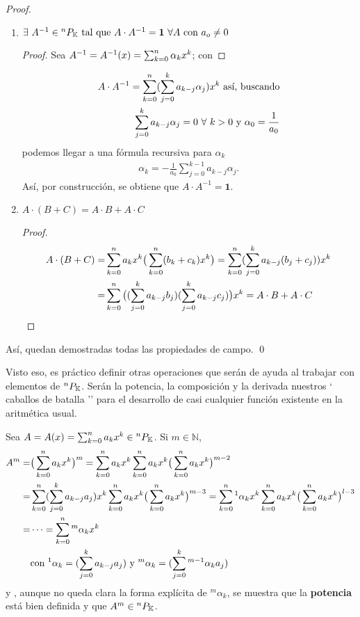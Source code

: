 \begin{proof}
\begin{enumerate}
 \item $\exists \  A^{-1} \in {^{n}P_{\mathbb{K}}} \text{ tal que } A \cdot A^{-1} = \textbf{1} \ \forall A \text{ con } a_o \neq 0 $
 \begin{proof}
 Sea $A^{-1} = A^{-1}(x) = \sum_{k=0}^n \alpha_k x^k$; con 
 \end{proof}
 \begin{align*}
  A \cdot A^{-1} = \sum_{k=0}^n  (\sum_{j=0}^k a_{k-j}\alpha_j )  x^k \text{ así, buscando} \\
  \sum_{j=0}^k a_{k-j} \alpha_j = 0 \ \forall \ k>0 \text{ y }  \alpha_0 = \frac{1}{a_0}  
 \end{align*}
 podemos llegar a una fórmula recursiva para $\alpha_k$
 \begin{align*}
 \alpha_k = -\frac{1}{a_0} \sum_{j=0}^{k-1}a_{k-j}\alpha_j.
 \end{align*}
 Así, por construcción, se obtiene que $ A \cdot A^{-1} = \textbf{1} $.
 \item $ A \cdot (B+C) = A \cdot B + A \cdot C $
 \begin{proof}
  \begin{align*}
  A \cdot (B+C) =& \sum_{k=0}^n a_k x^k \big(\sum_{k=0}^n (b_k + c_k) x^k \big) = \sum_{k=0}^n (\sum_{j=0}^k a_{k-j}(b_j+c_j) ) x^k \\
  =& \sum_{k=0}^n  \big( (\sum_{j=0}^k a_{k-j}b_j ) (\sum_{j=0}^k a_{k-j}c_j ) \big)  x^k = A \cdot B + A \cdot C
  \end{align*}   
 \end{proof}
 
\end{enumerate}
Así, quedan demostradas todas las propiedades de campo. \qed
\end{proof}

Visto eso, es práctico definir otras operaciones que serán de ayuda al trabajar con elementos de ${^{n}P_{\mathbb{K}}}$. Serán la potencia, la composición y la derivada nuestros ` caballos de batalla '' para el desarrollo de casi cualquier función existente en la aritmética usual.

Sea $A = A(x) = \sum_{k=0}^n a_k x^k \in {^{n}P_{\mathbb{K}}}$. Si $m \in \mathbb{N}$,
\begin{align*}
 A^m =& \big(\sum_{k=0}^n a_k x^k\big)^m = \sum_{k=0}^n a_k x^k\sum_{k=0}^n a_k x^k\big(\sum_{k=0}^n a_k x^k\big)^{m-2} \\
 =& \sum_{k=0}^n (\sum_{j=0}^k a_{k-j}a_j ) x^k\sum_{k=0}^n a_k x^k\big(\sum_{k=0}^n a_k x^k\big)^{m-3} = \sum_{k=0}^n {^1\alpha_k} x^k\sum_{k=0}^n a_k x^k\big(\sum_{k=0}^n a_k x^k\big)^{l-3} \\
 =& \cdots = \sum_{k=0}^n {^m\alpha_k} x^k \\
 &\text{con } {^1\alpha_k} = (\sum_{j=0}^k a_{k-j}a_j ) \text{ y } {^m\alpha_k} = (\sum_{j=0}^k {^{m-1}\alpha_k}a_j ) \\
\end{align*}
y , aunque no queda clara la forma explícita de ${^m\alpha_k}$, se muestra que la \textbf{potencia} está bien definida y que $A^m \in {^{n}P_{\mathbb{K}}}$.


